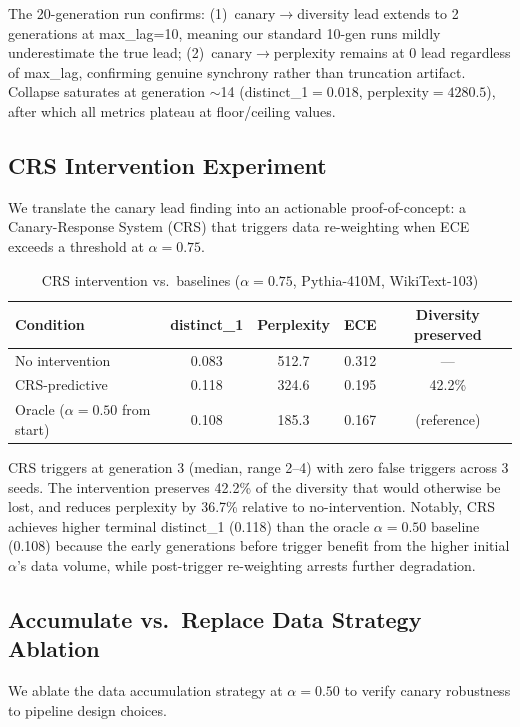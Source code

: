 \documentclass[letterpaper]{article}
\begin{document}
The 20-generation run confirms: (1)~canary$\to$diversity lead extends to 2 generations at max\_lag=10, meaning our standard 10-gen runs mildly underestimate the true lead; (2)~canary$\to$perplexity remains at 0 lead regardless of max\_lag, confirming genuine synchrony rather than truncation artifact. Collapse saturates at generation $\sim$14 (distinct\_1$=0.018$, perplexity$=4280.5$), after which all metrics plateau at floor/ceiling values.

\subsection{CRS Intervention Experiment}

We translate the canary lead finding into an actionable proof-of-concept: a Canary-Response System (CRS) that triggers data re-weighting when ECE exceeds a threshold at $\alpha=0.75$.

\begin{table}[h]
\centering
\caption{CRS intervention vs.\ baselines ($\alpha=0.75$, Pythia-410M, WikiText-103)}
\label{tab:intervention}
\begin{tabular}{lcccc}
\toprule
Condition & distinct\_1 & Perplexity & ECE & Diversity preserved \\
\midrule
No intervention & 0.083 & 512.7 & 0.312 & --- \\
CRS-predictive & 0.118 & 324.6 & 0.195 & 42.2\% \\
Oracle ($\alpha{=}0.50$ from start) & 0.108 & 185.3 & 0.167 & (reference) \\
\bottomrule
\end{tabular}
\end{table}

CRS triggers at generation 3 (median, range 2--4) with zero false triggers across 3 seeds. The intervention preserves 42.2\% of the diversity that would otherwise be lost, and reduces perplexity by 36.7\% relative to no-intervention. Notably, CRS achieves higher terminal distinct\_1 (0.118) than the oracle $\alpha=0.50$ baseline (0.108) because the early generations before trigger benefit from the higher initial $\alpha$'s data volume, while post-trigger re-weighting arrests further degradation.

\subsection{Accumulate vs.\ Replace Data Strategy Ablation}

We ablate the data accumulation strategy at $\alpha=0.50$ to verify canary robustness to pipeline design choices.
\end{document}
